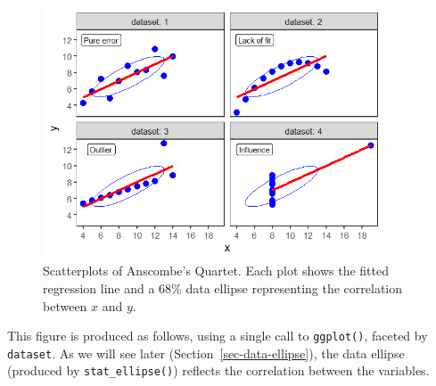 \documentclass[
  letterpaper,
  10pt,
  krantz2]{krantz}
\begin{document}
\begin{figure}

{\centering \includegraphics[width=0.9\textwidth,height=\textheight]{figs/ch02/ch02-anscombe1.png}

}

\caption{\label{fig-ch02-anscombe1}Scatterplots of Anscombe's Quartet.
Each plot shows the fitted regression line and a 68\% data ellipse
representing the correlation between \(x\) and \(y\).}

\end{figure}

This figure is produced as follows, using a single call to
\texttt{ggplot()}, faceted by \texttt{dataset}. As we will see later
(Section~\ref{sec-data-ellipse}), the data ellipse (produced by
\texttt{stat\_ellipse()}) reflects the correlation between the
variables.
\end{document}
